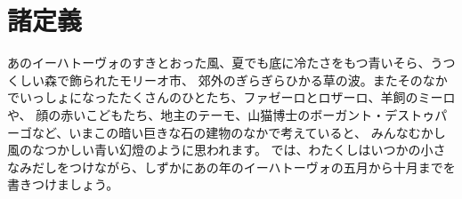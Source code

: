 \chapter{諸定義}
 あのイーハトーヴォのすきとおった風、夏でも底に冷たさをもつ青いそら、うつくしい森で飾られたモリーオ市、
 郊外のぎらぎらひかる草の波。またそのなかでいっしょになったたくさんのひとたち、ファゼーロとロザーロ、羊飼のミーロや、
 顔の赤いこどもたち、地主のテーモ、山猫博士のボーガント・デストゥパーゴなど、いまこの暗い巨きな石の建物のなかで考えていると、
 みんなむかし風のなつかしい青い幻燈のように思われます。
 では、わたくしはいつかの小さなみだしをつけながら、しずかにあの年のイーハトーヴォの五月から十月までを書きつけましょう。